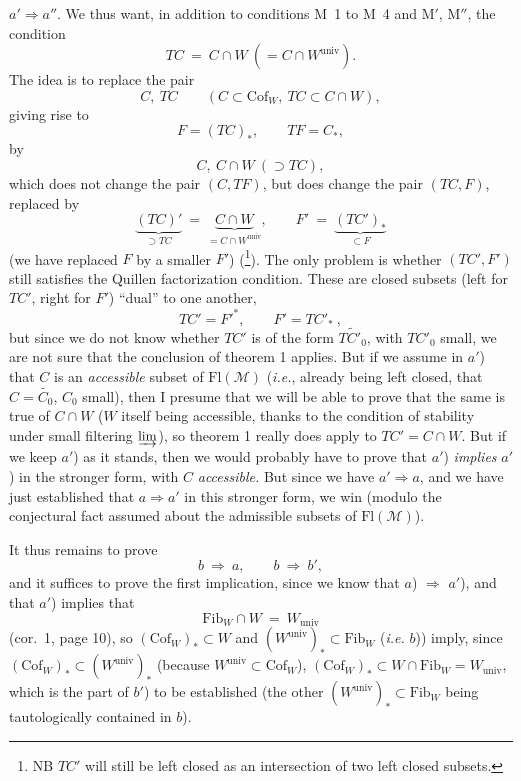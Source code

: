 \documentclass[11pt]{article}
\newcommand{\printedpage}[1]{\marginpar{\footnotesize p.~#1}}
\newcommand{\msp}[1]{\marginpar{\footnotesize [#1]}}
\newcommand{\Cof}{\mathrm{Cof}}
\newcommand{\Fib}{\mathrm{Fib}}
\newcommand{\Fl}{\mathrm{Fl}}
\newcommand{\univ}{\mathrm{univ}}
\begin{document}
$a' \Longrightarrow a''$. We thus want, in addition to conditions M~1 to M~4 and M$'$, M$''$, the condition
\[ TC \ =\ C \cap W\ (= C \cap W^{\univ}). \]
The idea is to replace the pair
\msp{page 18}
\[ C,\ TC \qquad (C \subset \Cof_W,\ TC \subset C \cap W), \]
giving rise to
\[ F = (TC)_*, \qquad TF = C_*, \]
by
\[ C,\ C \cap W\ (\supset TC), \]
\printedpage{11}
which does not change the pair $(C, TF)$, but does change the pair $(TC, F)$, replaced by
\[ \underbrace{(TC)'}_{\supset TC} \ =\ \underbrace{C \cap W}_{= C\cap W^{\univ}}, \qquad F' \ =\ \underbrace{(TC')_*}_{\subset F} \]
(we have replaced $F$ by a smaller $F'$) (\footnote[14]{NB $TC'$ will still be left closed as an intersection of two left closed subsets.}). The only problem is whether $(TC', F')$ still satisfies the Quillen factorization condition. These are closed subsets (left for $TC'$, right for $F'$) ``dual'' to one another,
\[ TC' = F'^*, \qquad F' = TC'_* \ , \]
but since we do not know whether $TC'$ is of the form $\widetilde{TC'_0}$, with $TC'_0$ small, we are not sure that the conclusion of theorem 1 applies. But if we assume in $a'$) that $C$ is an \textit{accessible} subset of $\Fl(\mathcal{M})$ (\textit{i.e.}, already being left closed, that $C = \widetilde{C_0}$, $C_0$ small),
\msp{page 19}
then I presume that we will be able to prove that the same is true of $C \cap W$ ($W$ itself being accessible, thanks to the condition of stability under small filtering $\varinjlim$), so theorem 1 really does apply to $TC' = C \cap W$. But if we keep $a'$) as it stands, then we would probably have to prove that $a'$) \textit{implies} $a'$) in the stronger form, with $C$ \textit{accessible.} But since we have $a' \Longrightarrow a$, and we have just established that $a \Longrightarrow a'$ in this stronger form, we win (modulo the conjectural fact assumed about the admissible subsets of $\Fl(\mathcal{M})$).

It thus remains to prove
\[ b \ \Longrightarrow\ a, \qquad b \ \Longrightarrow\ b', \]
and it suffices to prove the first implication, since we know that $a$) $\Longrightarrow$ $a'$), and that $a'$) implies that
\[ \Fib_W \cap W \ =\ W_{\univ} \]
(cor.~1, page 10), so $(\Cof_W)_* \subset W$ and $(W^{\univ})_* \subset \Fib_W$ (\textit{i.e.} $b$)) imply, since $(\Cof_W)_* \subset (W^{\univ})_*$ (because $W^{\univ} \subset \Cof_W$), $(\Cof_W)_* \subset W \cap \Fib_W = W_{\univ}$, which is the part of $b'$) to be established (the other $(W^{\univ})_* \subset \Fib_W$ being tautologically contained in $b$).

\msp{page 20}
\end{document}
